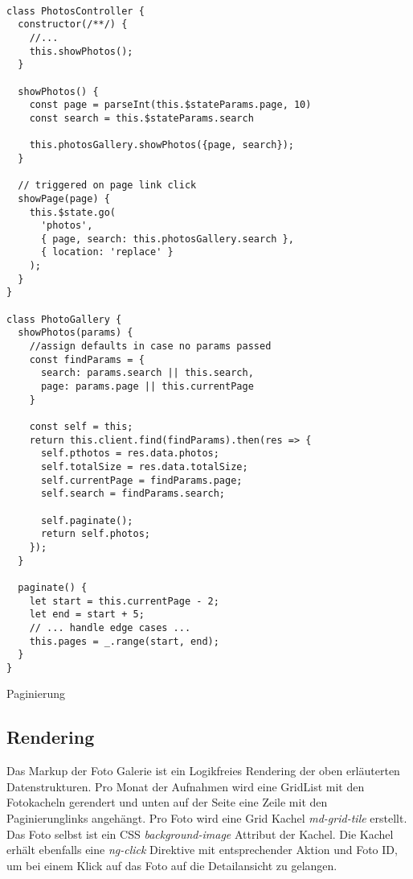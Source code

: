 \begin{listing}[H]
\begin{verbatim}

class PhotosController {
  constructor(/**/) {
    //...
    this.showPhotos();
  }

  showPhotos() {
    const page = parseInt(this.$stateParams.page, 10)
    const search = this.$stateParams.search

    this.photosGallery.showPhotos({page, search});
  }

  // triggered on page link click
  showPage(page) {
    this.$state.go(
      'photos', 
      { page, search: this.photosGallery.search },
      { location: 'replace' }
    );
  }
}

class PhotoGallery {
  showPhotos(params) {
    //assign defaults in case no params passed
    const findParams = {
      search: params.search || this.search,
      page: params.page || this.currentPage
    }

    const self = this;
    return this.client.find(findParams).then(res => {
      self.pthotos = res.data.photos;
      self.totalSize = res.data.totalSize;
      self.currentPage = findParams.page;
      self.search = findParams.search;

      self.paginate();
      return self.photos;
    });
  }

  paginate() {
    let start = this.currentPage - 2;
    let end = start + 5;
    // ... handle edge cases ...
    this.pages = _.range(start, end);
  }
}

\end{verbatim}
\caption{Paginierung}
\label{lst:pagination}
\end{listing} 

\subsection{Rendering}
\label{sec:rendering}

Das Markup der Foto Galerie ist ein Logikfreies Rendering der oben erläuterten Datenstrukturen. Pro Monat der Aufnahmen wird eine GridList mit den Fotokacheln gerendert und unten auf der Seite eine Zeile mit den Paginierunglinks angehängt.
Pro Foto wird eine Grid Kachel \textit{md-grid-tile} erstellt. Das Foto selbst ist ein CSS \textit{background-image} Attribut der Kachel. Die Kachel erhält ebenfalls eine \textit{ng-click} Direktive mit entsprechender Aktion und Foto  ID, um bei einem Klick auf das Foto auf die Detailansicht zu gelangen.

